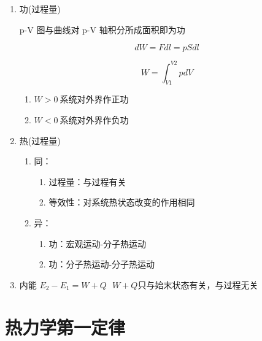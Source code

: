 \begin{enumerate}
    \item 功(过程量)

          p-V 图与曲线对 p-V 轴积分所成面积即为功

          \begin{equation}
              dW=Fdl=pSdl
          \end{equation}

          \begin{equation}
              W=\int_{V1}^{V2}{pdV}
          \end{equation}

          \begin{enumerate}
              \item $W>0~$系统对外界作正功
              \item $W<0~$系统对外界作负功
          \end{enumerate}

    \item 热(过程量)

          \begin{enumerate}
              \item  同：
                    \begin{enumerate}
                        \item 过程量：与过程有关
                        \item 等效性：对系统热状态改变的作用相同
                    \end{enumerate}

              \item 异：
                    \begin{enumerate}
                        \item 功：宏观运动-分子热运动
                        \item 功：分子热运动-分子热运动
                    \end{enumerate}
          \end{enumerate}

    \item 内能
          $E_2-E_1=W+Q~~~W+Q只与始末状态有关，与过程无关$

\end{enumerate}

\section{热力学第一定律}

